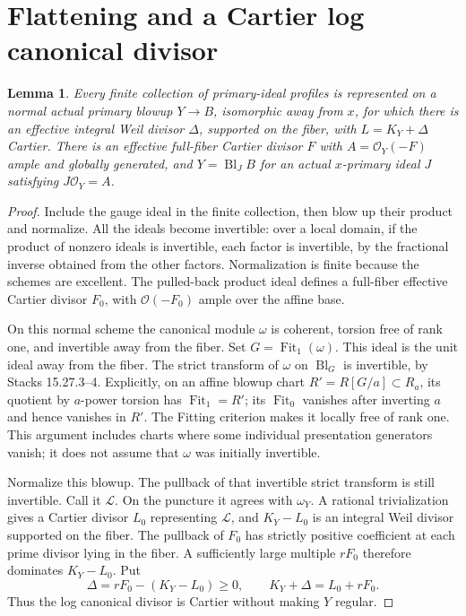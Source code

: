 \documentclass[11pt]{article}
\newtheorem{lemma}[theorem]{Lemma}
\newcommand{\OO}{\mathcal O}
\newcommand{\Bl}{\operatorname{Bl}}
\newcommand{\Fit}{\operatorname{Fit}}
\begin{document}
\section{Flattening and a Cartier log canonical divisor}
\begin{lemma}\label{lem:flatten}
Every finite collection of primary-ideal profiles is represented on a normal
actual primary blowup $Y\to B$, isomorphic away from $x$, for which there is
an effective integral Weil divisor $\Delta$, supported on the fiber, with
$L=K_Y+\Delta$ Cartier. There is an effective full-fiber Cartier divisor $F$
with $A=\OO_Y(-F)$ ample and globally generated, and $Y=\Bl_J B$ for an
actual $x$-primary ideal $J$ satisfying $J\OO_Y=A$.
\end{lemma}
\begin{proof}
Include the gauge ideal in the finite collection, then blow up their product
and normalize.
All the ideals become invertible: over a local domain, if the product of
nonzero ideals is invertible, each factor is invertible, by the fractional
inverse obtained from the other factors. Normalization is finite because
the schemes are excellent. The pulled-back product ideal defines a full-fiber
effective Cartier divisor $F_0$, with $\OO(-F_0)$ ample over the affine base.

On this normal scheme the canonical module $\omega$ is coherent, torsion
free of rank one, and invertible away from the fiber. Set $G=\Fit_1(\omega)$.
This ideal is the unit ideal away from the fiber. The strict transform of
$\omega$ on $\Bl_G$ is invertible, by Stacks 15.27.3--4. Explicitly, on an
affine blowup chart $R'=R[G/a]\subset R_a$, its quotient by $a$-power
torsion has $\Fit_1=R'$; its $\Fit_0$ vanishes after inverting $a$ and hence
vanishes in $R'$. The Fitting criterion makes it locally free of rank one.
This argument includes charts where some individual presentation generators
vanish; it does not assume that $\omega$ was initially invertible.

Normalize this blowup. The pullback of that invertible strict transform
is still invertible. Call it $\mathscr L$. On the puncture it agrees with
$\omega_Y$. A rational trivialization gives a Cartier divisor $L_0$
representing $\mathscr L$, and $K_Y-L_0$ is an integral Weil divisor supported
on the fiber. The pullback of $F_0$ has strictly positive coefficient at
each prime divisor lying in the fiber. A sufficiently large multiple
$rF_0$ therefore dominates $K_Y-L_0$. Put
\[
 \Delta=rF_0-(K_Y-L_0)\geq0,
 \qquad K_Y+\Delta=L_0+rF_0.
\]
Thus the log canonical divisor is Cartier without making $Y$ regular.


\end{proof}
\end{document}
